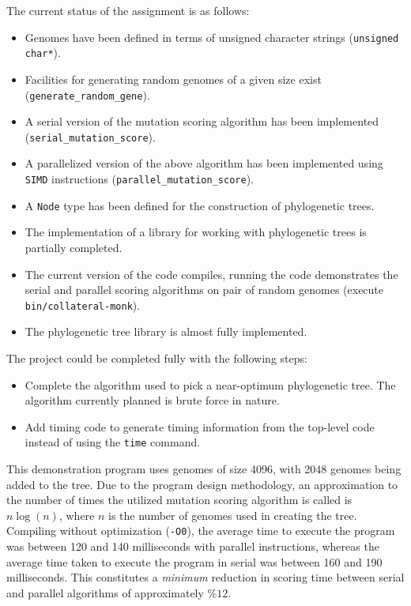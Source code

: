 \documentclass{article}
\begin{document}


The current status of the assignment is as follows:

\begin{itemize}
        \item Genomes have been defined in terms of unsigned character strings ({\tt unsigned char*}).
        \item Facilities for generating random genomes of a given size exist ({\tt generate\_random\_gene}).
        \item A serial version of the mutation scoring algorithm has been implemented ({\tt serial\_mutation\_score}).
        \item A parallelized version of the above algorithm has been implemented using {\tt SIMD} instructions ({\tt parallel\_mutation\_score}).
        \item A {\tt Node} type has been defined for the construction of phylogenetic trees.
        \item The implementation of a library for working with phylogenetic trees is partially completed.
        \item The current version of the code compiles, running the code demonstrates the serial and parallel scoring algorithms on pair of random genomes (execute {\tt bin/collateral-monk}).
        \item The phylogenetic tree library is almost fully implemented.
\end{itemize}

The project could be completed fully with the following steps:

\begin{itemize}
        \item Complete the algorithm used to pick a near-optimum phylogenetic tree. The algorithm currently planned is brute force in nature.
        \item Add timing code to generate timing information from the top-level code instead of using the {\tt time} command.
\end{itemize}


This demonstration program uses genomes of size 4096, with 2048 genomes being added to the tree.
Due to the program design methodology, an approximation to the number of times the utilized mutation scoring algorithm is called is \(n \log(n)\), where \(n\) is the number of genomes used in creating the tree.
Compiling without optimization ({\tt -O0}), the average time to execute the program was between 120 and 140 milliseconds with parallel instructions, whereas the average time taken to execute the program in serial was between 160 and 190 milliseconds.
This constitutes a {\it minimum} reduction in scoring time between serial and parallel algorithms of approximately \(\% 12\).
\end{document}
